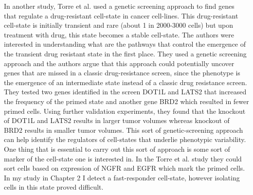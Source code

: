 In another study, Torre et al. \cite{torre2021ng} used a genetic screening approach to find genes that regulate a drug-resistant cell-state in cancer cell-lines. This drug-resistant cell-state is initially transient and rare (about 1 in 2000-3000 cells) but upon treatment with drug, this state becomes a stable cell-state.  The authors were interested in understanding what are the pathways that control the emergence of the transient drug resistant state in the first place. They used a genetic screening approach and the authors argue that this approach could potentially uncover genes that are missed in a classic drug-resistance screen, since the phenotype is the emergence of an intermediate state instead of a classic drug resistance screen. They tested two genes identified in the screen DOT1L and LATS2 that increased the frequency of the primed state and another gene BRD2 which resulted in fewer primed cells. Using further validation experiments, they found that the knockout of DOT1L and LATS2 results in larger tumor volumes whereas knockout of BRD2 results in smaller tumor volumes. This sort of genetic-screening approach can help identify the regulators of cell-states that underlie phenotypic variability. One thing that is essential to carry out this sort of approach is some sort of marker of the cell-state one is interested in. In the Torre et al. study they could sort cells based on expression of NGFR and EGFR which mark the primed cells. In my study in Chapter 2 I detect a fast-responder cell-state, however isolating cells in this state proved difficult.

